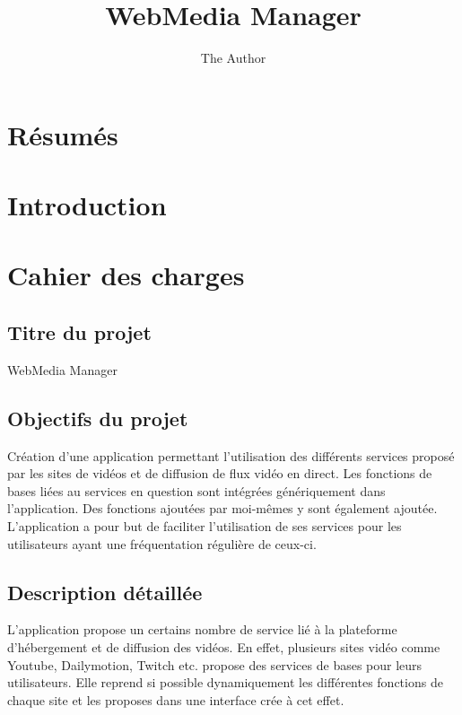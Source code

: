 \documentclass[11pt]{report} %
\title{WebMedia Manager}
\author{The Author}
\begin{document}
\maketitle
\newpage

\tableofcontents

\chapter{Résumés}

\chapter{Introduction}

\chapter{Cahier des charges}
	\section{Titre du projet}
	WebMedia Manager

	\section{Objectifs du projet}
	Création d’une application permettant l’utilisation des différents services proposé par les sites de vidéos et de diffusion de flux vidéo en direct.
	Les fonctions de bases liées au services en question sont intégrées génériquement dans l’application.
	Des fonctions ajoutées par moi-mêmes y sont également ajoutée.
	L’application a pour but de faciliter l’utilisation de ses services pour les utilisateurs ayant une fréquentation régulière de ceux-ci.

	\section{Description détaillée}
	L’application propose un certains nombre de service lié à la plateforme d’hébergement et de diffusion des vidéos. En effet, plusieurs sites vidéo comme Youtube, Dailymotion, Twitch etc. propose des services de bases pour leurs utilisateurs.
	Elle reprend si possible dynamiquement les différentes fonctions de chaque site et les proposes dans une interface crée à cet effet.
\end{document}
